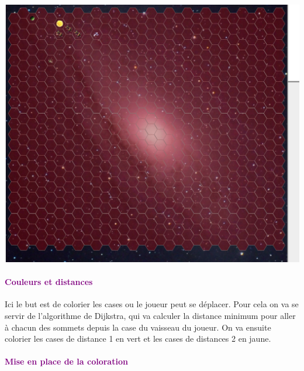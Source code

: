 \documentclass{report}
\begin{document}
      \begin{center}  
          \includegraphics[scale=0.30]{Images/effaceColoration.png}
      \end{center} 
       
       
      \paragraph{\textcolor{purple} {Couleurs et distances}} 
      Ici le but est de colorier les cases ou le joueur peut se déplacer. 
      Pour cela on va  se servir de l'algorithme de Dijkstra, qui va calculer la distance minimum pour aller à chacun des sommets depuis la case du vaisseau du joueur. On va ensuite colorier les cases de distance 1 en vert et les cases de distances 2 en jaune.
       
      
			\paragraph{\textcolor{purple}{Mise en place de la coloration}}
			
\end{document}
